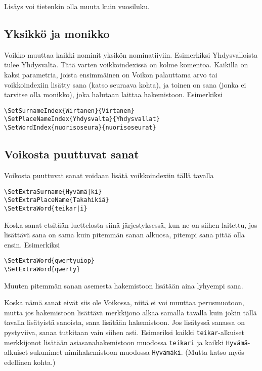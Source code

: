 \documentclass[12pt]{article}
\begin{document}
Lisäys voi tietenkin olla muuta kuin vuosiluku.


\subsection*{Yksikkö ja monikko}

Voikko muuttaa kaikki nominit yksikön nominatiiviin. Esimerkiksi
Yhdysvalloista tulee Yhdysvalta. Tätä varten voikkoindexissä on kolme
komentoa. Kaikilla on kaksi parametria, joista ensimmäinen on Voikon
palauttama arvo tai voikkoindexiin lisätty sana (katso seuraava
kohta), ja toinen on sana (jonka ei tarvitse olla monikko), joka
halutaan laittaa hakemistoon. Esimerkiksi

\begin{verbatim}
\SetSurnameIndex{Wirtanen}{Virtanen}
\SetPlaceNameIndex{Yhdysvalta}{Yhdysvallat}
\SetWordIndex{nuorisoseura}{nuorisoseurat}
\end{verbatim}


\subsection*{Voikosta puuttuvat sanat}

Voikosta puuttuvat sanat voidaan lisätä voikkoindexiin tällä tavalla

\begin{verbatim}
\SetExtraSurname{Hyvämä|ki}
\SetExtraPlaceName{Takahikiä}
\SetExtraWord{teikar|i}
\end{verbatim}

Koska sanat etsitään luettelosta siinä järjestyksessä, kun ne on
siihen laitettu, jos lisättävä sana on sama kuin pitemmän sanan
alkuosa, pitempi sana pitää olla ensin. Esimerkiksi

\begin{verbatim}
\SetExtraWord{qwertyuiop}
\SetExtraWord{qwerty}
\end{verbatim}

Muuten pitemmän sanan asemesta hakemistoon lisätään aina lyhyempi
sana.

Koska nämä sanat eivät siis ole Voikossa, niitä ei voi muuttaa
perusmuotoon, mutta jos hakemistoon lisättävä merkkijono alkaa samalla
tavalla kuin jokin tällä tavalla lisätyistä sanoista, sana lisätään
hakemistoon. Jos lisätyssä sanassa on pystyviiva, sanaa tutkitaan vain
siihen asti. Esimeriksi kaikki \verb=teikar=-alkuiset merkkijonot
lisätään asiasanahakemistoon muodossa \verb=teikari= ja kaikki
\verb=Hyvämä=-alkuiset sukunimet nimihakemistoon muodossa
\verb=Hyvämäki=. (Mutta katso myös edellinen kohta.)
\end{document}
